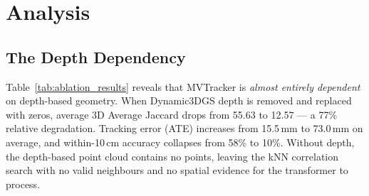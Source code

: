 \documentclass[12pt, a4paper, oneside]{report}
\begin{document}
\begin{table}[htbp]
    \centering
    \caption{Ablation study comparing Dynamic3DGS depth vs zero depth with and without SAM3D mesh augmentation. Dynamic3DGS depths are near-perfect (trained on test scenes), while zero depth forces the model to rely solely on RGB features and camera geometry. All numbers are percentages except ATE (mm). Mesh augmentation provides minimal benefit with perfect depth (+0.5 AJ average) and no benefit without depth (+0.01 AJ average).}
    \label{tab:ablation_results}
\end{table}

\section{Analysis}

\subsection{The Depth Dependency}
Table~\ref{tab:ablation_results} reveals that MVTracker is \emph{almost entirely dependent} on depth-based geometry. When Dynamic3DGS depth is removed and replaced with zeros, average 3D Average Jaccard drops from 55.63 to 12.57 --- a 77\% relative degradation. Tracking error (ATE) increases from 15.5\,mm to 73.0\,mm on average, and within-10\,cm accuracy collapses from 58\% to 10\%. Without depth, the depth-based point cloud contains no points, leaving the kNN correlation search with no valid neighbours and no spatial evidence for the transformer to process.
\end{document}
